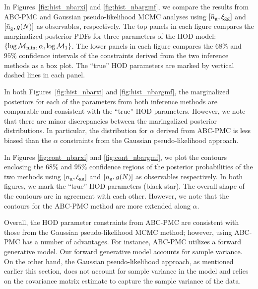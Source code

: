 In Figures~\ref{fig:hist_nbarxi} and \ref{fig:hist_nbargmf}, we compare the results from
ABC-PMC and Gaussian pseudo-likelihood MCMC analyses using $[\bar{n}_{\mathrm{g}}, \xi_{\mathrm{gg}}]$ and 
$[\bar{n}_{\mathrm{g}}, g(N)]$ as observables, respectively. The top panels in each figure 
compares the marginalized posterior PDFs for three parameters of the HOD model: 
$\{\log \mathcal{M}_{\rm min}, \alpha, \log\mathcal{M}_1\}$. The lower panels in each 
figure compares the $68\%$ and $95\%$ confidence intervals of the constraints 
derived from the two inference methods as a box plot. The ``true'' HOD parameters
are marked by vertical dashed lines in each panel. 



In both Figures~\ref{fig:hist_nbarxi} and \ref{fig:hist_nbargmf}, the marginalized 
posteriors for each of the parameters from both inference methods are comparable 
and consistent with the ``true'' HOD parameters. However, we note that there are 
minor discrepancies between the maringalized posterior distributions. In particular, 
the distribution for $\alpha$ derived from ABC-PMC is less biased than the $\alpha$ 
constraints from the Gaussian pseudo-likelihood approach. 



In Figures \ref{fig:cont_nbarxi} and \ref{fig:cont_nbargmf}, we plot the contours 
enclosing the $68\%$ and $95\%$ confidence regions of the posterior probabilities of 
the two methods using $[\bar{n}_{\mathrm{g}}, \xi_{\mathrm{gg}}]$ and $[\bar{n}_{\mathrm{g}}, g(N)]$ as observables 
respectively. In both figures, we mark the ``true'' HOD parameters (black star). The 
overall shape of the contours are in agreement with each other. However, we note
that the contours for the ABC-PMC method are more extended along $\alpha$. 


Overall, the HOD parameter constraints from ABC-PMC are consistent with those from 
the Gaussian pseudo-likelihood MCMC method; however, using ABC-PMC has a number of 
advantages. For instance, ABC-PMC utilizes a forward generative model. Our forward 
generative model accounts for sample variance. On the other hand, the Gaussian 
pseudo-likelihood approach, as mentioned earlier this section, does not account 
for sample variance in the model and relies on the covariance matrix estimate to 
capture the sample variance of the data. 


